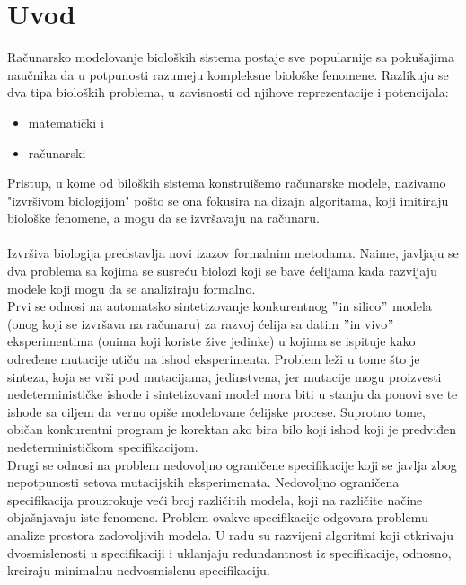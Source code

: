 \documentclass[a4paper]{article}
\begin{document}
\section{Uvod}
\label{sec:uvod}
Računarsko modelovanje bioloških sistema postaje sve popularnije sa pokušajima naučnika da u potpunosti razumeju kompleksne biološke fenomene.
Razlikuju se dva tipa bioloških problema, u zavisnosti od njihove reprezentacije i potencijala:
\begin{itemize}
\item matematički i
\item računarski
\end{itemize} 
Pristup, u kome od biloških sistema konstruišemo računarske modele, nazivamo "izvršivom biologijom" pošto se ona fokusira na dizajn algoritama, koji imitiraju biološke fenomene, a mogu da se izvršavaju na računaru.\cite{execbio} \\\\
Izvršiva biologija predstavlja novi izazov formalnim metodama.
Naime, javljaju se dva problema sa kojima se susreću biolozi koji se bave ćelijama kada razvijaju modele koji mogu da se analiziraju formalno.\\ Prvi se odnosi na automatsko sintetizovanje konkurentnog $"$in silico$"$ modela (onog koji se izvršava na računaru) za razvoj ćelija sa datim $"$in vivo$"$ eksperimentima (onima koji koriste žive jedinke) u kojima se ispituje kako određene mutacije utiču na ishod eksperimenta. Problem leži u tome što je sinteza, koja se vrši pod mutacijama, jedinstvena, jer mutacije mogu proizvesti nedeterminističke ishode i sintetizovani model mora biti u stanju da ponovi sve te ishode sa ciljem da verno opiše modelovane ćelijske procese. Suprotno tome, običan konkurentni program je korektan ako bira bilo koji ishod koji je predviđen nedeterminističkom specifikacijom. \\
Drugi se odnosi na problem nedovoljno ograničene specifikacije koji se javlja zbog nepotpunosti setova mutacijskih eksperimenata. Nedovoljno ograničena specifikacija prouzrokuje veći broj različitih modela, koji na različite načine objašnjavaju iste fenomene. Problem ovakve specifikacije odgovara problemu analize prostora zadovoljivih modela. U radu su razvijeni algoritmi koji otkrivaju dvosmislenosti u specifikaciji i uklanjaju redundantnost iz specifikacije, odnosno, kreiraju minimalnu nedvosmislenu specifikaciju.
\end{document}
